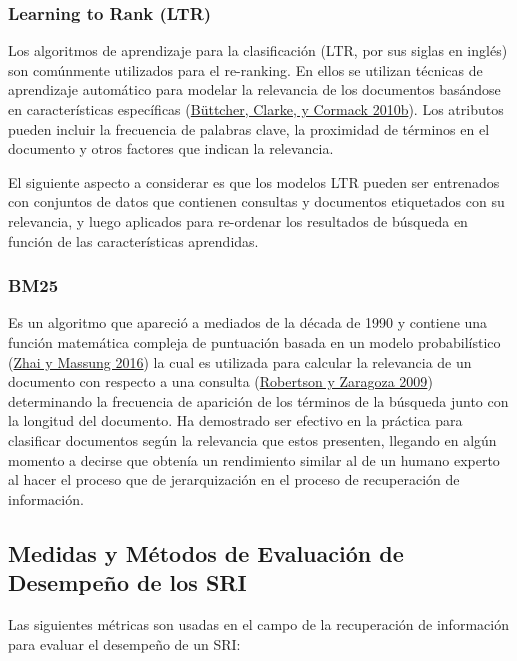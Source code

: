 \documentclass[
  12pt,
  openany]{book}
\begin{document}
\hypertarget{learning-to-rank-ltr}{%
\subsubsection{Learning to Rank (LTR)}\label{learning-to-rank-ltr}}

Los algoritmos de aprendizaje para la clasificación (LTR, por sus siglas en inglés) son comúnmente utilizados para el re-ranking. En ellos se utilizan técnicas de aprendizaje automático para modelar la relevancia de los documentos basándose en características específicas (\protect\hyperlink{ref-buxfcttcher2010}{Büttcher, Clarke, y Cormack 2010b}). Los atributos pueden incluir la frecuencia de palabras clave, la proximidad de términos en el documento y otros factores que indican la relevancia.

El siguiente aspecto a considerar es que los modelos LTR pueden ser entrenados con conjuntos de datos que contienen consultas y documentos etiquetados con su relevancia, y luego aplicados para re-ordenar los resultados de búsqueda en función de las características aprendidas.

\hypertarget{bm25}{%
\subsubsection{BM25}\label{bm25}}

Es un algoritmo que apareció a mediados de la década de 1990 y contiene una función matemática compleja de puntuación basada en un modelo probabilístico (\protect\hyperlink{ref-zhai2016}{Zhai y Massung 2016}) la cual es utilizada para calcular la relevancia de un documento con respecto a una consulta (\protect\hyperlink{ref-robertson2009}{Robertson y Zaragoza 2009}) determinando la frecuencia de aparición de los términos de la búsqueda junto con la longitud del documento. Ha demostrado ser efectivo en la práctica para clasificar documentos según la relevancia que estos presenten, llegando en algún momento a decirse que obtenía un rendimiento similar al de un humano experto al hacer el proceso que de jerarquización en el proceso de recuperación de información.

\hypertarget{evaluacion}{%
\subsection{Medidas y Métodos de Evaluación de Desempeño de los SRI}\label{evaluacion}}

Las siguientes métricas son usadas en el campo de la recuperación de información para evaluar el desempeño de un SRI:
\end{document}
